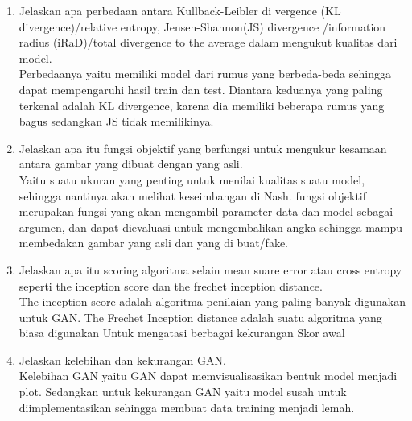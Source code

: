 \begin{enumerate}
\item Jelaskan apa perbedaan antara Kullback-Leibler di vergence (KL divergence)/relative entropy, Jensen-Shannon(JS) divergence /information radius (iRaD)/total divergence to the average dalam mengukut kualitas dari model.\\
Perbedaanya yaitu memiliki model dari rumus yang berbeda-beda sehingga dapat mempengaruhi hasil train dan test. Diantara keduanya yang paling terkenal adalah KL divergence, karena dia memiliki beberapa rumus yang bagus sedangkan JS tidak memilikinya.

\item Jelaskan apa itu fungsi objektif yang berfungsi untuk mengukur kesamaan antara gambar yang dibuat dengan yang asli.\\
Yaitu suatu ukuran yang penting untuk menilai kualitas suatu model, sehingga nantinya akan melihat keseimbangan di Nash.
fungsi objektif merupakan fungsi yang akan mengambil parameter data dan model sebagai argumen, dan dapat dievaluasi untuk mengembalikan angka sehingga mampu membedakan gambar yang asli dan yang di buat/fake.

\item Jelaskan apa itu scoring algoritma selain mean suare error atau cross entropy seperti the inception score dan the frechet inception distance.\\
The inception score adalah algoritma penilaian yang paling banyak digunakan untuk GAN. The Frechet Inception distance adalah suatu algoritma yang biasa digunakan Untuk mengatasi berbagai kekurangan Skor awal

\item Jelaskan kelebihan dan kekurangan GAN.\\
Kelebihan GAN yaitu GAN dapat memvisualisasikan bentuk model menjadi plot. Sedangkan untuk kekurangan GAN yaitu model susah untuk diimplementasikan sehingga membuat data training menjadi lemah.

\end{enumerate}

